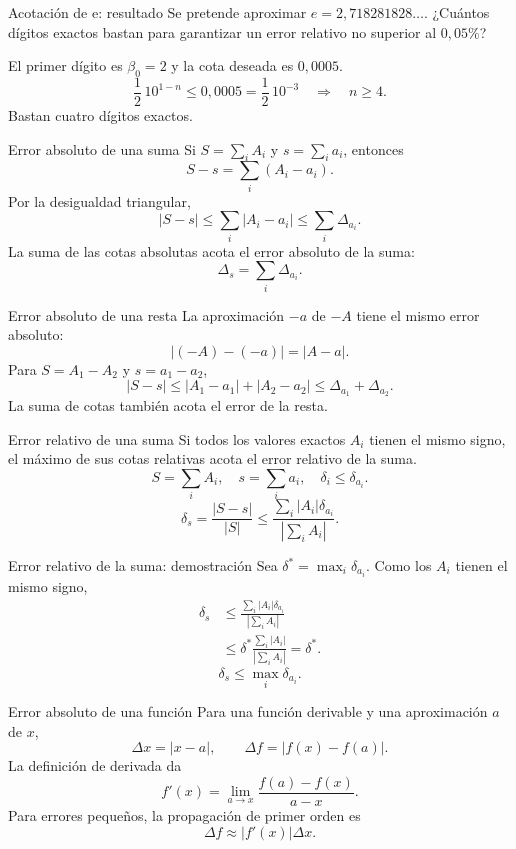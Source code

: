 \documentclass[main.tex]{subfiles}
\begin{document}
\begin{frame}{Acotación de e: resultado}
Se pretende aproximar $e=2{,}718281828\ldots$. ¿Cuántos dígitos exactos bastan para garantizar un error relativo no superior al $0{,}05\%$?\par\medskip El primer dígito es $\beta_0=2$ y la cota deseada es $0{,}0005$.\[\frac12\,10^{1-n}\le0{,}0005=\frac12\,10^{-3}\quad\Longrightarrow\quad n\ge4.\]Bastan cuatro dígitos exactos.
\end{frame}

\begin{frame}{Error absoluto de una suma}
\small Si $S=\sum_iA_i$ y $s=\sum_i a_i$, entonces\[S-s=\sum_i(A_i-a_i).\]Por la desigualdad triangular,\[|S-s|\le\sum_i|A_i-a_i|\le\sum_i\Delta_{a_i}.\]La suma de las cotas absolutas acota el error absoluto de la suma:\[\boxed{\Delta_s=\sum_i\Delta_{a_i}.}\]
\end{frame}

\begin{frame}{Error absoluto de una resta}
La aproximación $-a$ de $-A$ tiene el mismo error absoluto:\[|(-A)-(-a)|=|A-a|.\]Para $S=A_1-A_2$ y $s=a_1-a_2$,\[|S-s|\le|A_1-a_1|+|A_2-a_2|\le\Delta_{a_1}+\Delta_{a_2}.\]La suma de cotas también acota el error de la resta.
\end{frame}

\begin{frame}{Error relativo de una suma}
Si todos los valores exactos $A_i$ tienen el mismo signo, el máximo de sus cotas relativas acota el error relativo de la suma.\[S=\sum_iA_i,\quad s=\sum_i a_i,\quad\delta_i\le\delta_{a_i}.\]\[\delta_s=\frac{|S-s|}{|S|}\le\frac{\sum_i|A_i|\delta_{a_i}}{|\sum_iA_i|}.\]
\end{frame}

\begin{frame}{Error relativo de la suma: demostración}
Sea $\delta^*=\max_i\delta_{a_i}$. Como los $A_i$ tienen el mismo signo,\begin{align*}\delta_s&\le\frac{\sum_i|A_i|\delta_{a_i}}{|\sum_iA_i|}\\&\le\delta^*\frac{\sum_i|A_i|}{|\sum_iA_i|}=\delta^*.\end{align*}\[\boxed{\delta_s\le\max_i\delta_{a_i}.}\]
\end{frame}

\begin{frame}{Error absoluto de una función}
Para una función derivable y una aproximación $a$ de $x$,\[\Delta x=|x-a|,\qquad\Delta f=|f(x)-f(a)|.\]La definición de derivada da\[f\prime(x)=\lim_{a\to x}\frac{f(a)-f(x)}{a-x}.\]Para errores pequeños, la propagación de primer orden es\[\Delta f\approx|f\prime(x)|\Delta x.\]
\end{frame}
\end{document}
